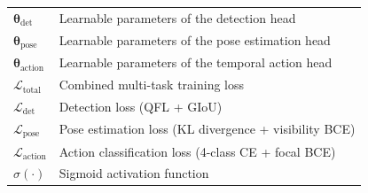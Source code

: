 \begin{longtable}{@{}p{3.2cm}p{9.5cm}@{}}
$\boldsymbol{\theta}_{\text{det}}$    & Learnable parameters of the detection head \\
$\boldsymbol{\theta}_{\text{pose}}$   & Learnable parameters of the pose estimation head \\
$\boldsymbol{\theta}_{\text{action}}$ & Learnable parameters of the temporal action head \\
$\mathcal{L}_{\text{total}}$          & Combined multi-task training loss \\
$\mathcal{L}_{\text{det}}$            & Detection loss (QFL + GIoU) \\
$\mathcal{L}_{\text{pose}}$           & Pose estimation loss (KL divergence + visibility BCE) \\
$\mathcal{L}_{\text{action}}$         & Action classification loss (4-class CE + focal BCE) \\
$\sigma(\cdot)$                       & Sigmoid activation function \\
\end{longtable}
\renewcommand{\arraystretch}{1}
